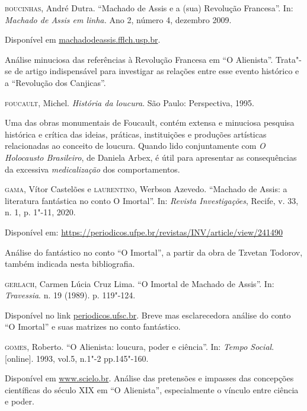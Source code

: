 \documentclass{extarticle}
\begin{document}
\textsc{boucinhas}, André Dutra. ``Machado de Assis e a (sua) Revolução
Francesa''. In: \textit{Machado de Assis em linha.} Ano 2, número 4,
dezembro 2009.

Disponível em \href{http://machadodeassis.fflch.usp.br/sites/machadodeassis.fflch.usp.br/files/u73/num04artigo06.pdf}{machadodeassis.fflch.usp.br}.

Análise minuciosa das referências à Revolução Francesa em ``O
Alienista''. Trata"-se de artigo indispensável para investigar as
relações entre esse evento histórico e a ``Revolução dos Canjicas''.

\textsc{foucault}, Michel. \textit{História da loucura}. São Paulo: Perspectiva,
1995.

Uma das obras monumentais de Foucault, contém extensa e minuciosa
pesquisa histórica e crítica das ideias, práticas, instituições e
produções artísticas relacionadas ao conceito de loucura. Quando lido
conjuntamente com \emph{O Holocausto Brasileiro}, de Daniela Arbex, é
útil para apresentar as consequências da excessiva \emph{medicalização}
dos comportamentos.

\textsc{gama}, Vítor Castelões e \textsc{laurentino}, Werbson Azevedo. ``Machado de Assis:
a literatura fantástica no conto O Imortal''. In: \textit{Revista
Investigações}, Recife, v. 33, n. 1, p. 1"-11, 2020.

Disponível em:
\url{https://periodicos.ufpe.br/revistas/INV/article/view/241490}

Análise do fantástico no conto ``O Imortal'', a partir da obra de
Tzvetan Todorov, também indicada nesta bibliografia.

\textsc{gerlach}, Carmen Lúcia Cruz Lima. ``O Imortal de Machado de Assis''. In:
\textit{Travessia}. n. 19 (1989). p. 119"-124.

Disponível no link \href{https://periodicos.ufsc.br/index.php/travessia/article/view/17343}{periodicos.ufsc.br}. Breve mas esclarecedora análise do conto ``O Imortal'' e suas matrizes
no conto fantástico.

\textsc{gomes}, Roberto. ``O Alienista: loucura, poder e ciência''. In:
\textit{Tempo Social}. {[}online{]}. 1993, vol.5, n.1"-2 pp.145"-160.

Disponível em \href{http://www.scielo.br/scielo.php?script=sci_arttext\&pid=S0103-20701993000100145\&lng=en\&nrm=iso}{www.scielo.br}. Análise das pretensões e impasses das concepções científicas do século
XIX em ``O Alienista'', especialmente o vínculo entre ciência e poder.
\end{document}
